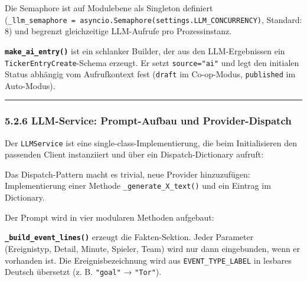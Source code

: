 Die Semaphore ist auf Modulebene als Singleton definiert
(\texttt{\_llm\_semaphore\ =\ asyncio.Semaphore(settings.LLM\_CONCURRENCY)},
Standard: 8) und begrenzt gleichzeitige LLM-Aufrufe pro Prozessinstanz.

\textbf{\texttt{make\_ai\_entry()}} ist ein schlanker Builder, der aus
den LLM-Ergebnissen ein \texttt{TickerEntryCreate}-Schema erzeugt. Er
setzt \texttt{source="ai"} und legt den initialen Status abhängig vom
Aufrufkontext fest (\texttt{draft} im Co-op-Modus, \texttt{published} im
Auto-Modus).

\begin{center}\rule{0.5\linewidth}{0.5pt}\end{center}

\subsubsection{5.2.6 LLM-Service: Prompt-Aufbau und
Provider-Dispatch}\label{llm-service-prompt-aufbau-und-provider-dispatch}

Der \texttt{LLMService} ist eine single-class-Implementierung, die beim
Initialisieren den passenden Client instanziiert und über ein
Dispatch-Dictionary aufruft:

\begin{Shaded}
\begin{Highlighting}[]
\OperatorTok{=}\NormalTok{ \{}
    \NormalTok{:       }
    \NormalTok{:     }
    \NormalTok{: }
    \NormalTok{:     }
    \NormalTok{:  }
\NormalTok{\}}
\NormalTok{ dispatch[}\NormalTok{.provider](}\OperatorTok{**}
\end{Highlighting}
\end{Shaded}

Das Dispatch-Pattern macht es trivial, neue Provider hinzuzufügen:
Implementierung einer Methode \texttt{\_generate\_X\_text()} und ein
Eintrag im Dictionary.

Der Prompt wird in vier modularen Methoden aufgebaut:

\textbf{\texttt{\_build\_event\_lines()}} erzeugt die Fakten-Sektion.
Jeder Parameter (Ereignistyp, Detail, Minute, Spieler, Team) wird nur
dann eingebunden, wenn er vorhanden ist. Die Ereignisbezeichnung wird
aus \texttt{EVENT\_TYPE\_LABEL} in lesbares Deutsch übersetzt (z. B.
\texttt{"goal"} → \texttt{"Tor"}).


